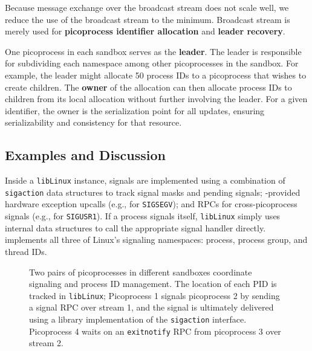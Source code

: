 Because message exchange over the broadcast stream does not scale well,
we reduce the use of the broadcast stream to the minimum.
Broadcast stream is merely used for {\bf picoprocess identifier allocation}
and {\bf leader recovery}.

One picoprocess in each sandbox serves as the {\bf leader}.
The leader is responsible for subdividing each namespace among other picoprocesses 
in the sandbox.
For example, the leader might allocate 50 process IDs to a picoprocess
that wishes to create children.  The {\bf owner} of the allocation can then allocate process IDs
to children from its local allocation without further involving the leader.
For a given identifier, the owner is the serialization point for all updates,
ensuring serializability and consistency for that resource.

\subsection{Examples and Discussion}

 Inside a {\tt libLinux} instance, signals are implemented using a combination of 
{\tt sigaction} data structures %
to track signal masks and pending signals;
\pal{}-provided hardware exception upcalls (e.g., for {\tt SIGSEGV});
and  RPCs for cross-picoprocess signals (e.g., for  {\tt SIGUSR1}).
If a process signals itself, {\tt libLinux} simply uses internal data structures
to call the appropriate signal handler directly.
\sysname{} implements all three of Linux's signaling namespaces:
process, process group, and thread IDs.

\begin{figure}
\centering
\caption[Sandboxing inter-process cordination in \sysname{}]
{Two pairs of \sysname{} picoprocesses in different sandboxes 
coordinate signaling and process ID management.
The location of each PID is tracked in {\tt libLinux}; Picoprocess 1 signals
picoprocess 2 by sending a signal RPC over stream 1,
and the signal is ultimately delivered using a 
library implementation of the {\tt sigaction} interface. Picoprocess 4 
waits on an {\tt exitnotify} RPC from  picoprocess 3 over stream 2. }
\label{fig:coordination}
\end{figure}

